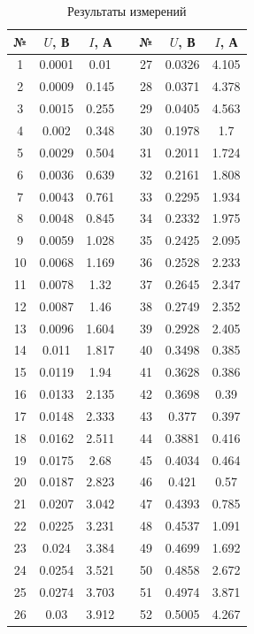 \documentclass[12pt]{kiarticle}
\begin{document}
	\begin{table}[h]
		\caption{Результаты измерений}
		\begin{center}
			\begin{tabular}{|c|c|c|c|c|c|c|}
				\hline
				№ & $ U $, В & $ I $, А &  & № & $ U $, В & $ I $, А  \\
				\hline
			 1 & 0.0001 & 0.01 & \text{} & 27 & 0.0326 & 4.105 \\
			2 & 0.0009 & 0.145 & \text{} & 28 & 0.0371 & 4.378 \\
			3 & 0.0015 & 0.255 & \text{} & 29 & 0.0405 & 4.563 \\
			4 & 0.002 & 0.348 & \text{} & 30 & 0.1978 & 1.7 \\
			5 & 0.0029 & 0.504 & \text{} & 31 & 0.2011 & 1.724 \\
			6 & 0.0036 & 0.639 & \text{} & 32 & 0.2161 & 1.808 \\
			7 & 0.0043 & 0.761 & \text{} & 33 & 0.2295 & 1.934 \\
			8 & 0.0048 & 0.845 & \text{} & 34 & 0.2332 & 1.975 \\
			9 & 0.0059 & 1.028 & \text{} & 35 & 0.2425 & 2.095 \\
			10 & 0.0068 & 1.169 & \text{} & 36 & 0.2528 & 2.233 \\
			11 & 0.0078 & 1.32 & \text{} & 37 & 0.2645 & 2.347 \\
			12 & 0.0087 & 1.46 & \text{} & 38 & 0.2749 & 2.352 \\
			13 & 0.0096 & 1.604 & \text{} & 39 & 0.2928 & 2.405 \\
			14 & 0.011 & 1.817 & \text{} & 40 & 0.3498 & 0.385 \\
			15 & 0.0119 & 1.94 & \text{} & 41 & 0.3628 & 0.386 \\
			16 & 0.0133 & 2.135 & \text{} & 42 & 0.3698 & 0.39 \\
			17 & 0.0148 & 2.333 & \text{} & 43 & 0.377 & 0.397 \\
			18 & 0.0162 & 2.511 & \text{} & 44 & 0.3881 & 0.416 \\
			19 & 0.0175 & 2.68 & \text{} & 45 & 0.4034 & 0.464 \\
			20 & 0.0187 & 2.823 & \text{} & 46 & 0.421 & 0.57 \\
			21 & 0.0207 & 3.042 & \text{} & 47 & 0.4393 & 0.785 \\
			22 & 0.0225 & 3.231 & \text{} & 48 & 0.4537 & 1.091 \\
			23 & 0.024 & 3.384 & \text{} & 49 & 0.4699 & 1.692 \\
			24 & 0.0254 & 3.521 & \text{} & 50 & 0.4858 & 2.672 \\
			25 & 0.0274 & 3.703 & \text{} & 51 & 0.4974 & 3.871 \\
			26 & 0.03 & 3.912 & \text{} & 52 & 0.5005 & 4.267 \\
				\hline
			\end{tabular}
		\end{center}
		\label{table_5}
	\end{table}
\end{document}
